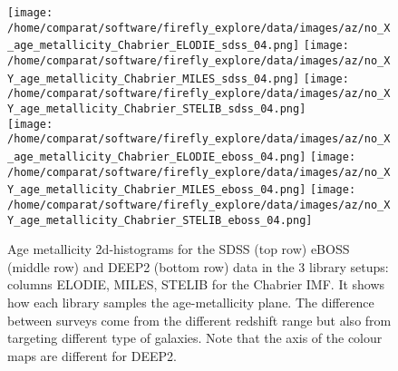 \documentclass[onecolumn]{aa}
\begin{document}
\begin{figure}
\begin{center}
\caption{\label{fig:distributions:AZ} 
Age metallicity 2d-histograms for the SDSS (top row) eBOSS (middle row) and DEEP2 (bottom row) data in the 3 library setups: columns ELODIE, MILES, STELIB for the Chabrier IMF. 
It shows how each library samples the age-metallicity plane. 
The difference between surveys come from the different redshift range but also from targeting different type of galaxies.
Note that the axis of the colour maps are different for DEEP2.}
\texttt{[image: /home/comparat/software/firefly\_explore/data/images/az/no\_X\_age\_metallicity\_Chabrier\_ELODIE\_sdss\_04.png]}
\hspace*{-1.78cm}
\texttt{[image: /home/comparat/software/firefly\_explore/data/images/az/no\_XY\_age\_metallicity\_Chabrier\_MILES\_sdss\_04.png]}
\hspace*{-1.78cm}
\texttt{[image: /home/comparat/software/firefly\_explore/data/images/az/no\_XY\_age\_metallicity\_Chabrier\_STELIB\_sdss\_04.png]} \\
\vspace*{-1.1cm}
\texttt{[image: /home/comparat/software/firefly\_explore/data/images/az/no\_X\_age\_metallicity\_Chabrier\_ELODIE\_eboss\_04.png]}
\hspace*{-1.78cm}
\texttt{[image: /home/comparat/software/firefly\_explore/data/images/az/no\_XY\_age\_metallicity\_Chabrier\_MILES\_eboss\_04.png]}
\hspace*{-1.78cm}
\texttt{[image: /home/comparat/software/firefly\_explore/data/images/az/no\_XY\_age\_metallicity\_Chabrier\_STELIB\_eboss\_04.png]}\\
\vspace*{-1.1cm}


\end{center}
\end{figure}
\end{document}
